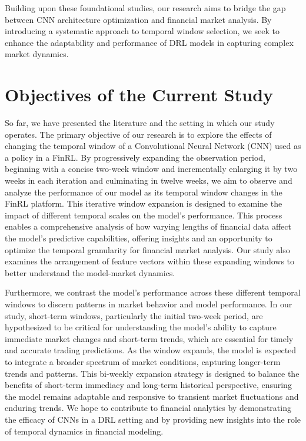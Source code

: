 Building upon these foundational studies, our research aims to bridge the gap between CNN architecture optimization and financial market analysis. By introducing a systematic approach to temporal window selection, we seek to enhance the adaptability and performance of DRL models in capturing complex market dynamics.
    
\section{Objectives of the Current Study}
So far, we have presented the literature and the setting in which our study operates. The primary objective of our research is to explore the effects of changing the temporal window of a Convolutional Neural Network (CNN) used as a policy in a FinRL. By progressively expanding the observation period, beginning with a concise two-week window and incrementally enlarging it by two weeks in each iteration and culminating in twelve weeks, we aim to observe and analyze the performance of our model as its temporal window changes in the FinRL platform. This iterative window expansion is designed to examine the impact of different temporal scales on the model's performance. This process enables a comprehensive analysis of how varying lengths of financial data affect the model's predictive capabilities, offering insights and an opportunity to optimize the temporal granularity for financial market analysis. Our study also examines the arrangement of feature vectors within these expanding windows to better understand the model-market dynamics.

Furthermore, we contrast the model's performance across these different temporal windows to discern patterns in market behavior and model performance. In our study, short-term windows, particularly the initial two-week period, are hypothesized to be critical for understanding the model's ability to capture immediate market changes and short-term trends, which are essential for timely and accurate trading predictions. As the window expands, the model is expected to integrate a broader spectrum of market conditions, capturing longer-term trends and patterns. This bi-weekly expansion strategy is designed to balance the benefits of short-term immediacy and long-term historical perspective, ensuring the model remains adaptable and responsive to transient market fluctuations and enduring trends. We hope to contribute to financial analytics by demonstrating the efficacy of CNNs in a DRL setting and by providing new insights into the role of temporal dynamics in financial modeling.